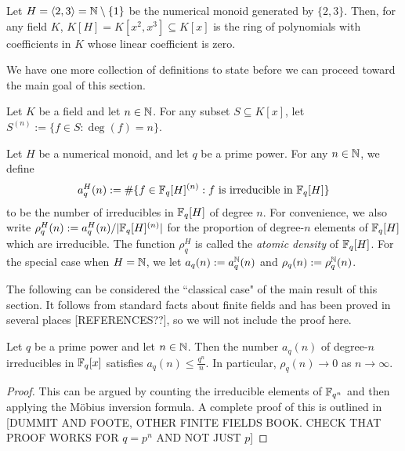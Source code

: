 \begin{eg}
Let $H = \langle 2,3 \rangle = \mathbb{N} \setminus \{1\}$ be the numerical monoid generated by $\{2,3\}$.
Then, for any field $K$, $K[H] = K[x^2,x^3] \subseteq K[x]$ is the ring of polynomials with coefficients in $K$ whose linear coefficient is zero.
\end{eg}

We have one more collection of definitions to state before we can proceed toward the main goal of this section.

\begin{defn}
Let $K$ be a field and let $n\in \mathbb{N}$.
For any subset $S \subseteq K[x]$, let $S^{(n)} := \{f\in S: \deg(f) = n\}$.

Let $H$ be a numerical monoid, and let $q$ be a prime power.
For any $n\in \mathbb{N}$, we define 
\[a_q^H(n) := \#\{f\in \mathbb{F}_q[H]^{(n)}: f \textrm{ is irreducible in } \mathbb{F}_q[H] \}\]
to be the number of irreducibles in $\mathbb{F}_q[H]$ of degree $n$.
For convenience, we also write $\rho_q^H(n) := a_q^H(n)/|\mathbb{F}_q[H]^{(n)}|$ for the proportion of degree-$n$ elements of $\mathbb{F}_q[H]$ which are irreducible.
The function $\rho_q^H$ is called the \textit{atomic density} of $\mathbb{F}_q[H]$.
For the special case when $H = \mathbb{N}$, we let $a_q(n) := a_q^{\mathbb{N}}(n)$ and $\rho_q(n) := \rho_q^{\mathbb{N}}(n)$.
\end{defn}

The following can be considered the ``classical case" of the main result of this section.
It follows from standard facts about finite fields and has been proved in several places [REFERENCES??], so we will not include the proof here.

\begin{prop}\label{prop:atoms in Fqx}
Let $q$ be a prime power and let $n\in \mathbb{N}$.
Then the number $a_q(n)$ of degree-$n$ irreducibles in $\mathbb{F}_q[x]$ satisfies $a_q(n) \le \frac{q^n}{n}$.
In particular, $\rho_q(n) \to 0$ as $n\to\infty$.
\end{prop}

\begin{proof}
This can be argued by counting the irreducible elements of $\mathbb{F}_{q^n}$ and then applying the M\"{o}bius inversion formula.
A complete proof of this is outlined in [DUMMIT AND FOOTE, OTHER FINITE FIELDS BOOK.  CHECK THAT PROOF WORKS FOR $q=p^n$ AND NOT JUST $p$]
\end{proof}


